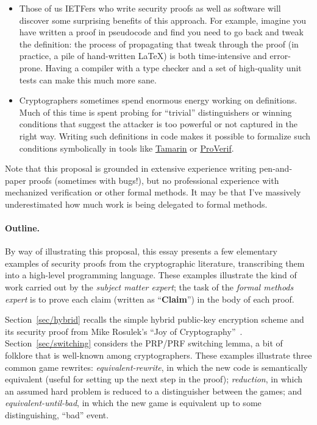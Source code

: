\documentclass{article}
\begin{document}
\begin{itemize}
  \item Those of us IETFers who write security proofs as well as software will
    discover some surprising benefits of this approach.
    For example, imagine you have written a proof in pseudocode and find you
    need to go back and tweak the definition: the process of propagating that
    tweak through the proof (in practice, a pile of hand-written \LaTeX) is
    both time-intensive and error-prone. Having a compiler with a type checker
    and a set of high-quality unit tests can make this much more sane.

  \item Cryptographers sometimes spend enormous energy working on definitions.
    Much of this time is spent probing for ``trivial'' distinguishers or
    winning conditions that suggest the attacker is too powerful or not
    captured in the right way.
    Writing such definitions in code makes it possible to formalize such
    conditions symbolically in tools like
    \href{https://tamarin-prover.com/}{Tamarin} or
    \href{https://bblanche.gitlabpages.inria.fr/proverif/}{ProVerif}.
\end{itemize}

Note that this proposal is grounded in extensive experience writing
pen-and-paper proofs (sometimes with bugs!), but no professional experience
with mechanized verification or other formal methods.
%
It may be that I've massively underestimated how much work is being delegated
to formal methods.

\paragraph{Outline.}
%
By way of illustrating this proposal, this essay presents a few elementary
examples of security proofs from the cryptographic literature, transcribing
them into a high-level programming language.
%
These examples illustrate the kind of work carried out by the \emph{subject
matter expert}; the task of the \emph{formal methods expert} is to prove each
claim (written as ``\textbf{Claim}'') in the body of each proof.

Section~\ref{sec/hybrid} recalls the simple hybrid public-key encryption scheme
and its security proof from Mike Rosulek's ``Joy of Cryptography''~\cite{joy}.
%
Section~\ref{sec/switching} considers the PRP/PRF switching lemma, a bit of
folklore that is well-known among cryptographers.
%
These examples illustrate three common game rewrites:
%
\emph{equivalent-rewrite}, in which the new code is semantically equivalent
(useful for setting up the next step in the proof);
%
\emph{reduction}, in which an assumed hard problem is reduced to
a distinguisher between the games; and
%
\emph{equivalent-until-bad}, in which the new game is equivalent up to some
distinguishing, ``bad'' event.
\end{document}

